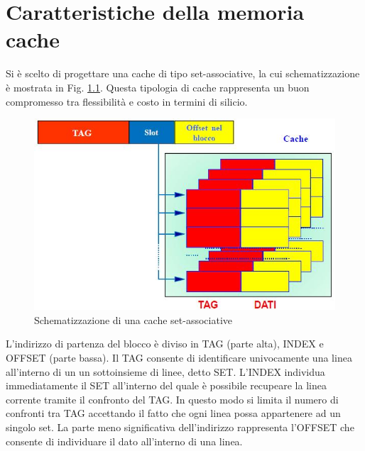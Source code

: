\clearpage{\pagestyle{empty}\cleardoublepage}
\chapter{Caratteristiche della memoria cache}


Si \`e scelto di progettare una cache di tipo set-associative, la cui schematizzazione \`e mostrata in Fig. \ref{fig:set_ass}.
Questa tipologia di cache rappresenta un buon compromesso tra flessibilit\`a e costo in termini di silicio.

\begin{figure}[!h]
\centering
\includegraphics[width=\textwidth]{img/set-associative.jpg}
\caption{Schematizzazione di una cache set-associative}
\label{fig:set_ass}
\end{figure}


L'indirizzo di partenza del blocco \`e diviso in TAG (parte alta), INDEX e OFFSET (parte bassa).
Il TAG consente di identificare univocamente una linea all'interno di un un sottoinsieme di linee, detto SET.
L'INDEX individua immediatamente il SET all'interno del quale \`e possibile recupeare la linea corrente tramite il confronto del TAG.
In questo modo si limita il numero di confronti tra TAG accettando il fatto che ogni linea possa appartenere ad un singolo set.
La parte meno significativa dell'indirizzo rappresenta l'OFFSET che consente di individuare il dato all'interno di una linea.

